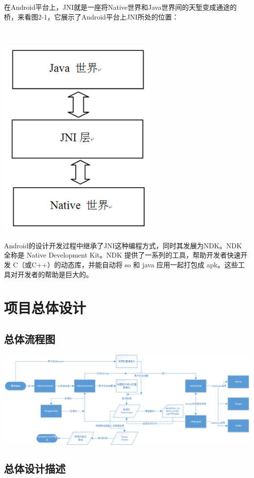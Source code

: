 \documentclass[UTF8, Microsoft YaHei]{book}
\begin{document}
    在Android平台上，JNI就是一座将Native世界和Java世界间的天堑变成通途的桥，来看图2-1，它展示了Android平台上JNI所处的位置：

    ~

    \includegraphics[width=0.6\textwidth]{./img/JNI.png}

    Android的设计开发过程中继承了JNI这种编程方式，同时其发展为NDK。NDK 全称是 Native Development Kit。NDK 提供了一系列的工具，帮助开发者快速开发 C（或C++）的动态库，并能自动将 so 和 java 应用一起打包成 apk。这些工具对开发者的帮助是巨大的。

    \chapter{项目总体设计}
    \section{总体流程图}

    \includegraphics[width=1.0\textwidth]{img/outline.png}

    \section{总体设计描述}
\end{document}
